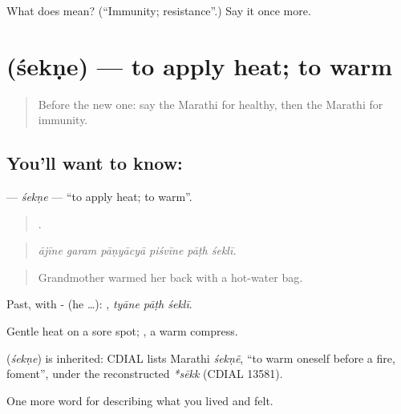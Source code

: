 \begin{tcolorbox}[breakable,colback=teal!4,colframe=teal!35!black,title={Before you move on}]
What does  mean? (\textquotedblleft{}Immunity; resistance\textquotedblright{}.) Say it once more.
\end{tcolorbox}
\section[\texorpdfstring{\mr{शेकणे} (śekṇe)}{शेकणे (śekṇe)}]{ (śekṇe) — to apply heat; to warm}

\label{lesson:MR-C490-sekne}



\begin{quote}
Before the new one: say the Marathi for healthy, then the Marathi for immunity.
\end{quote}

\subsection*{You'll want to know: }
\textbf{} — \emph{śekṇe} — \textquotedblleft{}to apply heat; to warm\textquotedblright{}.

\begin{quote}
     .
\end{quote}

\begin{quote}
\emph{ājīne garam pāṇyācyā piśvīne pāṭh śeklī.}
\end{quote}

\begin{quote}
Grandmother warmed her back with a hot-water bag.
\end{quote}

Past, with - (he …):   , \emph{tyāne pāṭh śeklī}.

Gentle heat on a sore spot; , a warm compress.

\begin{cousinweb}
\textbf{} (\emph{śekṇe}) is inherited: CDIAL lists Marathi \emph{śekṇẽ}, \textquotedblleft{}to warm oneself before a fire, foment\textquotedblright{}, under the reconstructed \emph{*sēkk} (CDIAL 13581).
\end{cousinweb}

\begin{grammarlens}[title={What you've built}]
One more word for describing what you lived and felt.
\end{grammarlens}

